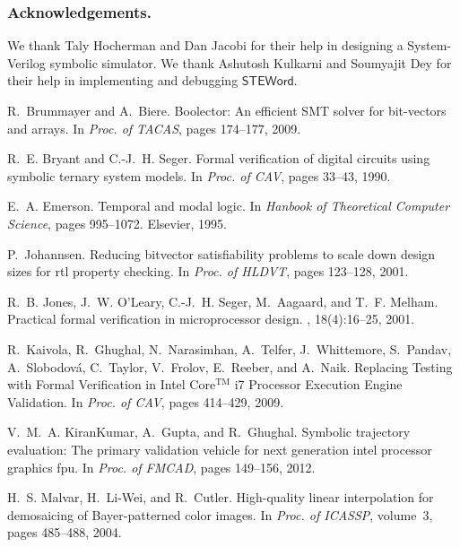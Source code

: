 \documentclass{llncs}
\newcommand{\steword}{\ensuremath{\mathsf{STEWord}}}
\begin{document}
\subsubsection{Acknowledgements.} We thank Taly Hocherman and Dan Jacobi for
their help in designing a System-Verilog symbolic simulator.  We thank
Ashutosh Kulkarni and Soumyajit Dey for their help in implementing and
debugging {\steword}.  
 
\begin{thebibliography}{10}

R.~Brummayer and A.~Biere.
\newblock Boolector: An efficient {SMT} solver for bit-vectors and arrays.
\newblock In {\em Proc. of TACAS}, pages 174--177, 2009.

R.~E. Bryant and C.-J.~H. Seger.
\newblock Formal verification of digital circuits using symbolic ternary system
  models.
\newblock In {\em Proc. of CAV}, pages 33--43, 1990.

E.~A. Emerson.
\newblock Temporal and modal logic.
\newblock In {\em Hanbook of {T}heoretical {C}omputer {S}cience}, pages
  995--1072. Elsevier, 1995.

P.~Johannsen.
\newblock Reducing bitvector satisfiability problems to scale down design sizes
  for rtl property checking.
\newblock In {\em Proc. of HLDVT}, pages 123--128, 2001.

R.~B. Jones, J.~W. O'Leary, C.-J.~H. Seger, M.~Aagaard, and T.~F. Melham.
\newblock Practical formal verification in microprocessor design.
, 18(4):16--25, 2001.

R.~Kaivola, R.~Ghughal, N.~Narasimhan, A.~Telfer, J.~Whittemore, S.~Pandav,
  A.~Slobodov{\'a}, C.~Taylor, V.~Frolov, E.~Reeber, and A.~Naik.
\newblock Replacing {T}esting with {F}ormal {V}erification in {I}ntel
  {C}ore$^\text{TM}$ i7 {P}rocessor {E}xecution {E}ngine {V}alidation.
\newblock In {\em Proc. of CAV}, pages 414--429, 2009.

V.~M.~A. KiranKumar, A.~Gupta, and R.~Ghughal.
\newblock Symbolic trajectory evaluation: The primary validation vehicle for
  next generation intel{\textregistered} processor graphics fpu.
\newblock In {\em Proc. of FMCAD}, pages 149--156, 2012.

H.~S. Malvar, H.~Li-Wei, and R.~Cutler.
\newblock High-quality linear interpolation for demosaicing of
  {B}ayer-patterned color images.
\newblock In {\em Proc. of ICASSP}, volume~3, pages 485--488, 2004.


\end{thebibliography}
\end{document}
